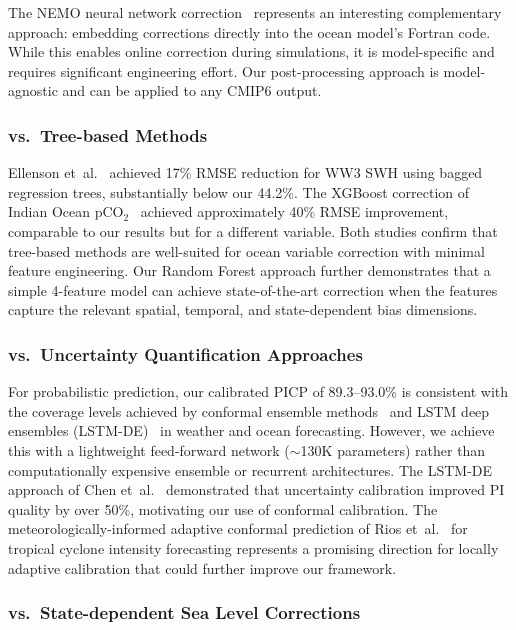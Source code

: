 \documentclass[conference]{IEEEtran}
\begin{document}
The NEMO neural network correction~\cite{guillou2025} represents an interesting complementary approach: embedding corrections directly into the ocean model's Fortran code. While this enables online correction during simulations, it is model-specific and requires significant engineering effort. Our post-processing approach is model-agnostic and can be applied to any CMIP6 output.

\subsubsection{vs.\ Tree-based Methods}

Ellenson et~al.~\cite{ellenson2020} achieved 17\% RMSE reduction for WW3 SWH using bagged regression trees, substantially below our 44.2\%. The XGBoost correction of Indian Ocean pCO$_2$~\cite{pco2_2025} achieved approximately 40\% RMSE improvement, comparable to our results but for a different variable. Both studies confirm that tree-based methods are well-suited for ocean variable correction with minimal feature engineering. Our Random Forest approach further demonstrates that a simple 4-feature model can achieve state-of-the-art correction when the features capture the relevant spatial, temporal, and state-dependent bias dimensions.

\subsubsection{vs.\ Uncertainty Quantification Approaches}

For probabilistic prediction, our calibrated PICP of 89.3--93.0\% is consistent with the coverage levels achieved by conformal ensemble methods~\cite{bassetti2024} and LSTM deep ensembles (LSTM-DE)~\cite{patel2024} in weather and ocean forecasting. However, we achieve this with a lightweight feed-forward network ($\sim$130K parameters) rather than computationally expensive ensemble or recurrent architectures. The LSTM-DE approach of Chen et~al.~\cite{patel2024} demonstrated that uncertainty calibration improved PI quality by over 50\%, motivating our use of conformal calibration. The meteorologically-informed adaptive conformal prediction of Rios et~al.~\cite{rios2025} for tropical cyclone intensity forecasting represents a promising direction for locally adaptive calibration that could further improve our framework.

\subsubsection{vs.\ State-dependent Sea Level Corrections}
\end{document}
